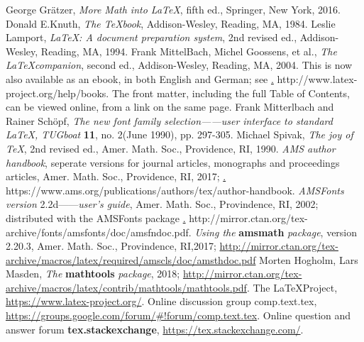 \documentclass[openany]{ctexbook}
\begin{document}


\begin{thebibliography}{2}
 George Gr\"atzer, \emph{More Math into \LaTeX}, fifth ed., Springer, New York, 2016.
 Donald E.Knuth, \emph{The \TeX book}, Addison-Wesley, Reading, MA, 1984.
 Leslie Lamport, \emph{\LaTeX: A document preparation system}, 2nd revised ed., Addison-Wesley, Reading, MA, 1994.
 Frank MittelBach, Michel Goossens, et al., \emph{The \LaTeX companion}, second ed., Addison-Wesley, Reading, MA, 2004. This is now also available as an ebook, in both English and German; see \href{http://www.latex-project.org/help/books}.
    {http://www.latex-project.org/help/books}. The front matter, including the full Table of Contents, can be viewed online, from a link on the same page.
 Frank Mitterlbach and Rainer Sch\"opf, \emph{The new font family selection——user interface to standard \LaTeX, TUGboat} \textbf{11}, no. 2(June 1990), pp. 297-305.
 Michael Spivak, \emph{The joy of \TeX}, 2nd revised ed., Amer. Math. Soc., Providence, RI, 1990.
 \emph{AMS author handbook}, seperate versions for journal articles, monographs and proceedings articles, Amer. Math. Soc., Providence, RI, 2017; \href{https://www.ams.org/publications/authors/tex/author-handbook}.
    {https://www.ams.org/publications/authors/tex/author-handbook}.
\emph{AMSFonts version} 2.2d——\emph{user's guide}, Amer. Math. Soc., Provindence, RI, 2002; distributed with the AMSFonts package \href{http://mirror.ctan.org/tex-archive/fonts/amsfonts/doc/amsfndoc.pdf}.
    {http://mirror.ctan.org/tex-archive/fonts/amsfonts/doc/amsfndoc.pdf}.
\emph{Using the} {\bfseries amsmath} \emph{package}, version 2.20.3, Amer. Math. Soc., Provindence, RI,2017; \href{http://mirror.ctan.org/tex-archive/macros/latex/required/amscls/doc/amsthdoc.pdf}
    {http://mirror.ctan.org/tex-archive/macros/latex/required/amscls/doc/amsthdoc.pdf}
Morten Hogholm, Lars Masden, \emph{The} {\bfseries mathtools} \emph{package}, 2018;
\href{http://mirror.ctan.org/tex-archive/macros/latex/contrib/mathtools/mathtools.pdf}
{http://mirror.ctan.org/tex-archive/macros/latex/contrib/mathtools/mathtools.pdf}.
The \LaTeX Project, \href{https://www.latex-project.org/}
{https://www.latex-project.org/}.
\bibitem Online discussion group comp.text.tex, \href{https://groups.google.com/forum/\#!forum/comp.text.tex}
    {https://groups.google.com/forum/\#!forum/comp.text.tex}.
Online question and answer forum {\bfseries tex.stackexchange},
\href{https://tex.stackexchange.com/}{https://tex.stackexchange.com/}.
\end{thebibliography}
\end{document}
